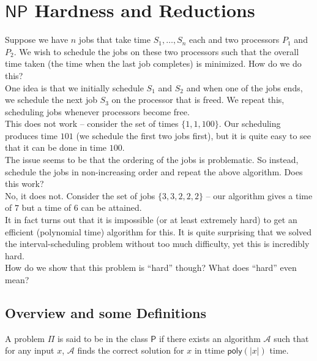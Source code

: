\section{\texorpdfstring{$\mathsf{NP}$}{NP} Hardness and Reductions}

	Suppose we have $n$ jobs that take time $S_1,\ldots,S_n$ each and two processors $P_1$ and $P_2$. We wish to schedule the jobs on these two processors such that the overall time taken (the time when the last job completes) is minimized. How do we do this?\\

	One idea is that we initially schedule $S_1$ and $S_2$ and when one of the jobs ends, we schedule the next job $S_3$ on the processor that is freed. We repeat this, scheduling jobs whenever processors become free.\\
	This does not work -- consider the set of times $\{1,1,100\}$. Our scheduling produces time $101$ (we schedule the first two jobs first), but it is quite easy to see that it can be done in time $100$.\\

	The issue seems to be that the ordering of the jobs is problematic. So instead, schedule the jobs in non-increasing order and repeat the above algorithm. Does this work?\\
	No, it does not. Consider the set of jobs $\{3,3,2,2,2\}$ -- our algorithm gives a time of $7$ but a time of $6$ can be attained.\\

	It in fact turns out that it is impossible (or at least extremely hard) to get an efficient (polynomial time) algorithm for this. It is quite surprising that we solved the interval-scheduling problem without too much difficulty, yet this is incredibly hard.\\
	How do we show that this problem is ``hard'' though? What does ``hard'' even mean?

\subsection{Overview and some Definitions}

	\begin{fdef}
		A problem $\mathsf{\Pi}$ is said to be in the class $\mathsf{P}$ if there exists an algorithm $\mathcal{A}$ such that for any input $x$, $\mathcal{A}$ finds the correct solution for $x$ in ttime $\textsf{poly}(|x|)$ time.
	\end{fdef}

